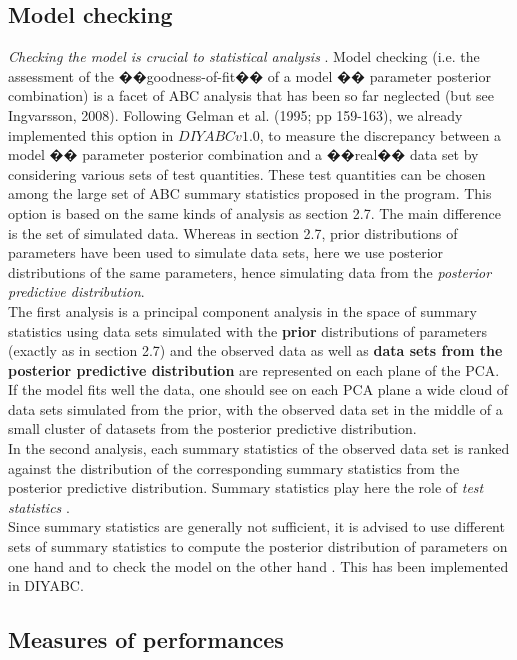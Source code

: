 \subsection{Model checking}

\emph{Checking the model is crucial to statistical analysis} \citep[p161 in][]{GCSR1995}.
Model checking (i.e. the assessment of the ��\textonehalf{}goodness-of-fit��\textonehalf{}
of a model ��\textonehalf{} parameter posterior combination) is a
facet of ABC analysis that has been so far neglected (but see Ingvarsson,
2008). Following Gelman et al. (1995; pp 159-163), we already implemented
this option in $DIYABCv1.0$, to measure the discrepancy between a
model ��\textonehalf{} parameter posterior combination and a ��\textonehalf{}real��\textonehalf{}
data set by considering various sets of test quantities. These test
quantities can be chosen among the large set of ABC summary statistics
proposed in the program. This option is based on the same kinds of
analysis as section 2.7. The main difference is the set of simulated
data. Whereas in section 2.7, prior distributions of parameters have
been used to simulate data sets, here we use posterior distributions
of the same parameters, hence simulating data from the \emph{posterior
predictive distribution}. \\
 The first analysis is a principal component analysis in the space
of summary statistics using data sets simulated with the \textbf{prior}
distributions of parameters (exactly as in section 2.7) and the observed
data as well as \textbf{data sets from the posterior predictive distribution}
are represented on each plane of the PCA. If the model fits well the
data, one should see on each PCA plane a wide cloud of data sets simulated
from the prior, with the observed data set in the middle of a small
cluster of datasets from the posterior predictive distribution.\\
 In the second analysis, each summary statistics of the observed data
set is ranked against the distribution of the corresponding summary
statistics from the posterior predictive distribution. Summary statistics
play here the role of \emph{test statistics} \citep[p169 in][]{GCSR1995}.\\
 Since summary statistics are generally not sufficient, it is advised
to use different sets of summary statistics to compute the posterior
distribution of parameters on one hand and to check the model on the
other hand \citep[see][]{C2010}. This has been implemented in DIYABC.


\subsection{Measures of performances}

